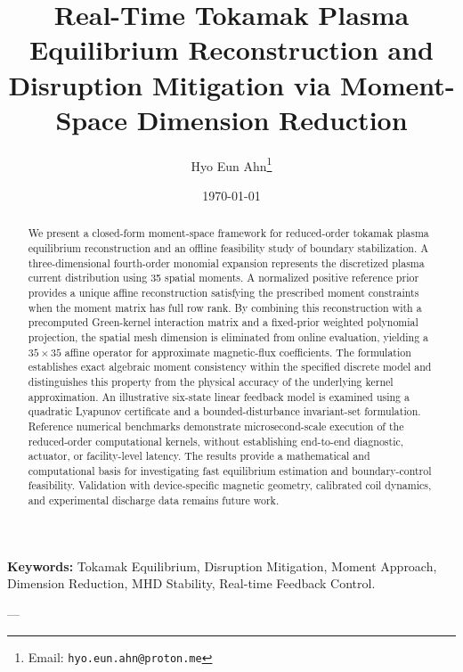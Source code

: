 \documentclass[11pt,a4paper]{article}
\title{\textbf{Real-Time Tokamak Plasma Equilibrium Reconstruction and Disruption Mitigation via Moment-Space Dimension Reduction}}
\author{Hyo Eun Ahn\thanks{Email: \texttt{hyo.eun.ahn@proton.me}}}
\date{\today}
\begin{document}
\maketitle

\begin{abstract}
We present a closed-form moment-space framework for reduced-order tokamak plasma equilibrium reconstruction and an offline feasibility study of boundary stabilization. A three-dimensional fourth-order monomial expansion represents the discretized plasma current distribution using 35 spatial moments. A normalized positive reference prior provides a unique affine reconstruction satisfying the prescribed moment constraints when the moment matrix has full row rank. By combining this reconstruction with a precomputed Green-kernel interaction matrix and a fixed-prior weighted polynomial projection, the spatial mesh dimension is eliminated from online evaluation, yielding a $35 \times 35$ affine operator for approximate magnetic-flux coefficients. The formulation establishes exact algebraic moment consistency within the specified discrete model and distinguishes this property from the physical accuracy of the underlying kernel approximation. An illustrative six-state linear feedback model is examined using a quadratic Lyapunov certificate and a bounded-disturbance invariant-set formulation. Reference numerical benchmarks demonstrate microsecond-scale execution of the reduced-order computational kernels, without establishing end-to-end diagnostic, actuator, or facility-level latency. The results provide a mathematical and computational basis for investigating fast equilibrium estimation and boundary-control feasibility. Validation with device-specific magnetic geometry, calibrated coil dynamics, and experimental discharge data remains future work.
\end{abstract}

\noindent\textbf{Keywords:} Tokamak Equilibrium, Disruption Mitigation, Moment Approach, Dimension Reduction, MHD Stability, Real-time Feedback Control.

---
\end{document}
